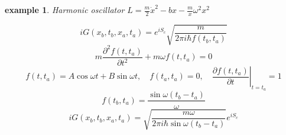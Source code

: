 \documentclass[a4paper,11pt]{article}
\newtheorem{example}{example}[subsection]
\begin{document}
\begin{example}
  Harmonic oscillator $L=\frac{m}{2}\dot{x}^2-bx-\frac{m}{x}\omega^2x^2$
\end{example}
\begin{equation*}
  iG(x_b,t_b,x_a,t_a)=e^{iS_c}\sqrt{\frac{m}{2\pi i\hbar f(t_b,t_a)}}
\end{equation*}
\begin{equation*}
  m\frac{\partial^2f(t,t_a)}{\partial t^2}+m\omega f(t,t_a)=0
\end{equation*}
\begin{equation*}
  f(t,t_a)=A\cos\omega t+B\sin\omega t,\quad f(t_a,t_a)=0,\quad \left.\frac{\partial f(t,t_a)}{\partial t}\right|_{t=t_a}=1
\end{equation*}
\begin{equation*}
  f(t_b,t_a)=\frac{\sin\omega(t_b-t_a)}{\omega}
\end{equation*}
\begin{equation*}
  iG(x_b,t_b,x_a,t_a)=\sqrt{\frac{m\omega}{2\pi i\hbar\sin\omega(t_b-t_a)}}e^{iS_c}
\end{equation*}
\end{document}
